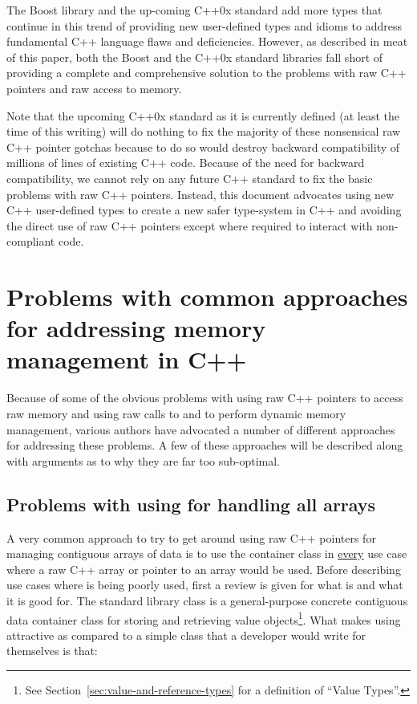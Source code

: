 \documentclass[pdf,ps2pdf,11pt]{SANDreport}
\begin{document}
The Boost library and the up-coming C++0x standard add more types that
continue in this trend of providing new user-defined types and idioms
to address fundamental C++ language flaws and deficiencies.  However,
as described in meat of this paper, both the Boost and the C++0x
standard libraries fall short of providing a complete and
comprehensive solution to the problems with raw C++ pointers and raw
access to memory.

Note that the upcoming C++0x standard as it is currently defined (at
least the time of this writing) will do nothing to fix the majority of
these nonsensical raw C++ pointer gotchas because to do so would
destroy backward compatibility of millions of lines of existing C++
code.  Because of the need for backward compatibility, we cannot rely
on any future C++ standard to fix the basic problems with raw C++
pointers.  Instead, this document advocates using new C++ user-defined
types to create a new safer type-system in C++ and avoiding the direct
use of raw C++ pointers except where required to interact with
non-compliant code.


%
{}\section{Problems with common approaches for addressing memory
management in C++}
\label{sec:current-appraoches-to-mem-mng}
%

Because of some of the obvious problems with using raw C++ pointers to
access raw memory and using raw calls to {} and
{} to perform dynamic memory management, various authors
have advocated a number of different approaches for addressing these
problems.  A few of these approaches will be described along with
arguments as to why they are far too sub-optimal.


%
{}\subsection{Problems with using {} for handling
all arrays}
%

A very common approach to try to get around using raw C++ pointers for
managing contiguous arrays of data is to use the container class
{} in {}\underline{every} use case where a raw C++
array or pointer to an array would be used.  Before describing use
cases where {} is being poorly used, first a review
is given for what {} is and what it is good for.  The
standard library class {} is a general-purpose
concrete contiguous data container class for storing and retrieving
value objects\footnote{See Section~\ref{sec:value-and-reference-types}
for a definition of ``Value Types''.}.  What makes using
{} attractive as compared to a simple class that a
developer would write for themselves is that:
\end{document}
